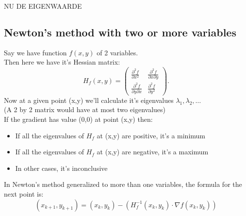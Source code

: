 \documentclass[journal]{IEEEtran}
\begin{document}
NU DE EIGENWAARDE


 
\subsection{Newton's method with two or more variables}
\label{Newton2}

Say we have function $f(x,y)$ of 2 variables.\\

Then here we have it's Hessian matrix:
\[
H_f(x,y) =
\begin{pmatrix}
\frac{\partial^2 f}{\partial x^2} & \frac{\partial^2 f}{\partial x \partial y} \\[1em]
\frac{\partial^2 f}{\partial y \partial x} & \frac{\partial^2 f}{\partial y^2}
\end{pmatrix}.
\]
Now at a given point (x,y) we'll calculate it's eigenvalues $\lambda_1, \lambda_2, \ldots$\\
(A 2 by 2 matrix would have at most two eigenvalues)\\

If the gradient has value (0,0) at point (x,y) then:
\begin{itemize}
    \item If all the eigenvalues of $H_f$ at (x,y) are positive, it's a minimum
    \item If all the eigenvalues of $H_f$ at (x,y) are negative, it's a maximum
    \item In other cases, it's inconclusive
\end{itemize}

In Newton's method generalized to more than one variables, the formula for the next point is:\\
\[
(x_{k+1},y_{k+1}) = (x_k,y_k) - ( H_f^{-1}(x_k,y_k) \cdot \nabla f(x_k,y_k) )
\]
\end{document}
